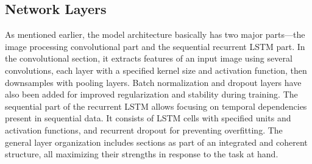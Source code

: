 \documentclass[a4paper]{report}
\begin{document}
{\subsection{Network Layers}
As mentioned earlier, the model architecture basically has two major parts—the image processing convolutional part and the sequential recurrent LSTM part. In the convolutional section, it extracts features of an input image using several convolutions, each layer with a specified kernel size and activation function, then downsamples with pooling layers. Batch normalization and dropout layers have also been added for improved regularization and stability during training. The sequential part of the recurrent LSTM allows focusing on temporal dependencies present in sequential data. It consists of LSTM cells with specified units and activation functions, and recurrent dropout for preventing overfitting. The general layer organization includes sections as part of an integrated and coherent structure, all maximizing their strengths in response to the task at hand.

}
\end{document}
